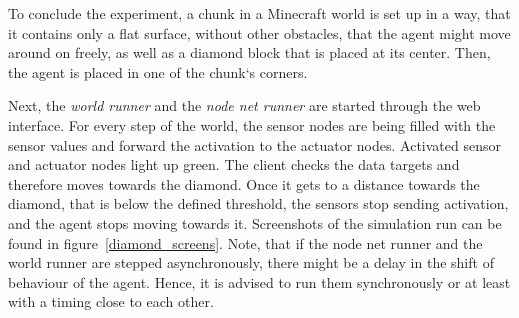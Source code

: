 To conclude the experiment, a chunk in a Minecraft world is set up in a way, that it contains only a flat surface, without other obstacles, that the agent might move around on freely, as well as a diamond block that is placed at its center. Then, the agent is placed in one of the chunk`s corners.

Next, the \emph{world runner} and the \emph{node net runner} are started through the web interface. For every step of the world, the sensor nodes are being filled with the sensor values and forward the activation to the actuator nodes. Activated sensor and actuator nodes light up green. The client checks the data targets and therefore moves towards the diamond. Once it gets to a distance towards the diamond, that is below the defined threshold, the sensors stop sending activation, and the agent stops moving towards it. Screenshots of the simulation run can be found in figure~\ref{diamond_screens}. Note, that if the node net runner and the world runner are stepped asynchronously, there might be a delay in the shift of behaviour of the agent. Hence, it is advised to run them synchronously or at least with a timing close to each other.

